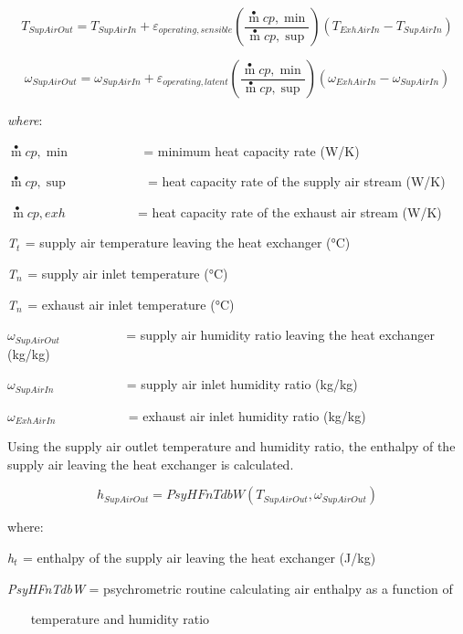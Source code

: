\begin{equation}
{T_{SupAirOut}} = {T_{SupAirIn}} + {\varepsilon_{operating,sensible}}\left( {\frac{{\mathop m\limits^ \bullet  cp,\min }}{{\mathop m\limits^ \bullet  cp,\sup }}} \right)({T_{ExhAirIn}} - {T_{SupAirIn}})
\end{equation}

\begin{equation}
{\omega_{SupAirOut}} = {\omega_{SupAirIn}} + {\varepsilon_{operating,latent}}\left( {\frac{{\mathop m\limits^ \bullet  cp,\min }}{{\mathop m\limits^ \bullet  cp,\sup }}} \right)({\omega_{ExhAirIn}} - {\omega_{SupAirIn}})
\end{equation}

\emph{where}:

\(\mathop m\limits^ \bullet cp,\min\) ~~~~~~~~~~ = minimum heat capacity rate (W/K)

\(\mathop m\limits^ \bullet cp,\sup\) ~~~~~~~~~~~ = heat capacity rate of the supply air stream (W/K)

\(\mathop {\,m}\limits^ \bullet cp,exh\) ~~~~~~~~~~ = heat capacity rate of the exhaust air stream (W/K)

\emph{T\(_{t}\)}\(_{ }\) = supply air temperature leaving the heat exchanger (°C)

\emph{T\(_{n}\)}\(_{ }\) = supply air inlet temperature (°C)

\emph{T\(_{n}\)}\(_{ }\) = exhaust air inlet temperature (°C)

\({\omega_{SupAirOut}}\) ~~~~~~~~~ = supply air humidity ratio leaving the heat exchanger (kg/kg)

\({\omega_{SupAirIn}}\) ~~~~~~~~~~ = supply air inlet humidity ratio (kg/kg)

\({\omega_{ExhAirIn}}\) ~~~~~~~~~~ = exhaust air inlet humidity ratio (kg/kg)

Using the supply air outlet temperature and humidity ratio, the enthalpy of the supply air leaving the heat exchanger is calculated.

\begin{equation}
{h_{SupAirOut}} = PsyHFnTdbW({T_{SupAirOut}},{\omega_{SupAirOut}})
\end{equation}

where:

\emph{h\(_{t}\)}\(_{ }\) = enthalpy of the supply air leaving the heat exchanger (J/kg)

\emph{PsyHFnTdbW} = psychrometric routine calculating air enthalpy as a function of

~~~ temperature and humidity ratio

